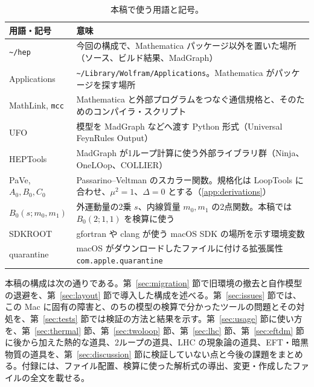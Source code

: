 \documentclass[a4paper,10pt]{ltjsarticle}
\newcommand{\pth}[1]{\texttt{\textasciitilde/}\nolinkurl{#1}}
\begin{document}
\begin{table}[tbp]
\centering\small
\caption{本稿で使う用語と記号。}
\label{tab:terms}
\begin{tabularx}{\linewidth}{>{\raggedright\arraybackslash}p{3.6cm}X}
\toprule
\textbf{用語・記号} & \textbf{意味} \\
\midrule
\texttt{\textasciitilde/hep} & 今回の構成で、Mathematica パッケージ以外を置いた場所（ソース、ビルド結果、MadGraph） \\
Applications & \pth{Library/Wolfram/Applications}。Mathematica がパッケージを探す場所 \\
MathLink, \texttt{mcc} & Mathematica と外部プログラムをつなぐ通信規格と、そのためのコンパイラ・スクリプト \\
UFO & 模型を MadGraph などへ渡す Python 形式（Universal FeynRules Output） \\
HEPTools & MadGraph が1ループ計算に使う外部ライブラリ群（Ninja、OneLOop、COLLIER） \\
PaVe, $A_0, B_0, C_0$ & Passarino--Veltman のスカラー関数。規格化は LoopTools に合わせ、$\mu^2=1$、$\Delta=0$ とする（\ref{app:derivations}） \\
$B_0(s;m_0,m_1)$ & 外運動量の2乗 $s$、内線質量 $m_0,m_1$ の2点関数。本稿では $B_0(2;1,1)$ を検算に使う \\
SDKROOT & gfortran や clang が使う macOS SDK の場所を示す環境変数 \\
quarantine & macOS がダウンロードしたファイルに付ける拡張属性 \texttt{com.apple.quarantine} \\
\bottomrule
\end{tabularx}
\end{table}

本稿の構成は次の通りである。第~\ref{sec:migration} 節で旧環境の撤去と自作模型の退避を、第~\ref{sec:layout} 節で導入した構成を述べる。第~\ref{sec:issues} 節では、この Mac に固有の障害と、のちの模型の検算で分かったツールの問題とその対処を、第~\ref{sec:tests} 節では検証の方法と結果を示す。第~\ref{sec:usage} 節に使い方を、第~\ref{sec:thermal} 節、第~\ref{sec:twoloop} 節、第~\ref{sec:lhc} 節、第~\ref{sec:eftdm} 節に後から加えた熱的な道具、2ループの道具、LHC の現象論の道具、EFT・暗黒物質の道具を、第~\ref{sec:discussion} 節に検証していない点と今後の課題をまとめる。付録には、ファイル配置、検算に使った解析式の導出、変更・作成したファイルの全文を載せる。
\end{document}
